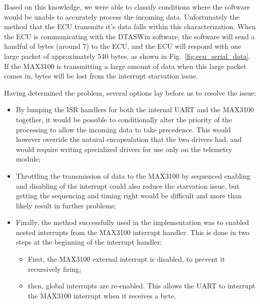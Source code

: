 Based on this knowledge, we were able to classify conditions where the software would be unable to accurately process the incoming data. Unfortunately the method that the ECU transmits it's data falls within this characterization. When the ECU is communicating with the DTASWin software, the software will send a handful of bytes (around 7) to the ECU, and the ECU will respond with one large packet of approximately 540 bytes, as shown in Fig.\ \ref{fig:ecu_serial_data}. If the MAX3100 is transmitting a large amount of data when this large packet comes in, bytes will be lost from the interrupt starvation issue.

Having determined the problem, several options lay before us to resolve the issue:
\begin{itemize}
  \item By lumping the ISR handlers for both the internal UART and the MAX3100 together, it would be possible to conditionally alter the priority of the processing to allow the incoming data to take precedence. This would however override the natural encapsulation that the two drivers had, and would require writing specialized drivers for use only on the telemetry module;
  \item Throttling the transmission of data to the MAX3100 by sequenced enabling and disabling of the interrupt could also reduce the starvation issue, but getting the sequencing and timing right would be difficult and more than likely result in further problems;
  \item Finally, the method successfully used in the implementation was to enabled nested interrupts from the MAX3100 interrupt handler. This is done in two steps at the beginning of the interrupt handler:
  \begin{itemize}
   \item First, the MAX3100 external interrupt is disabled, to prevent it recursively firing;
    \item then, global interrupts are re-enabled. This allows the UART to interrupt the MAX3100 interrupt when it receives a byte.
  \end{itemize}
\end{itemize}